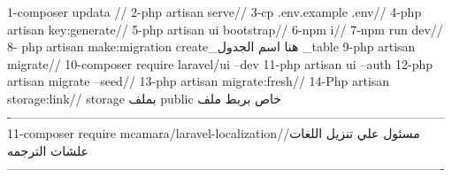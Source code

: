 1-composer updata //
2-php artisan serve//
3-cp .env.example .env//
4-php artisan key:generate//
5-php artisan ui bootstrap//
6-npm i//
7-npm run dev//
8- php artisan make:migration create_هنا اسم الجدول _table
9-php artisan migrate//
10-composer require laravel/ui --dev
11-php artisan ui --auth
12-php artisan migrate --seed//
13-php artisan migrate:fresh//
14-Php artisan storage:link// storage بملف public  خاص بربط ملف 
----------------------------------------------------------------------------------------------------------
11-composer require mcamara/laravel-localization//مسئول علي تنزيل اللغات علشات الترجمه 
----------------------------------------------------------------------------------------------------------


